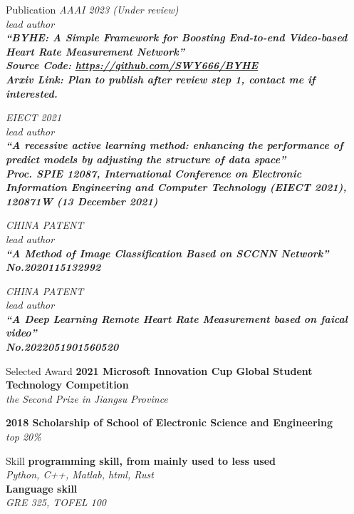 \documentclass{resume} %
\begin{document}
\begin{rSection}{Publication}
    {\em AAAI 2023 (Under review) \\ lead author\\ \bf ``BYHE: A Simple Framework for Boosting End-to-end Video-based Heart Rate Measurement Network'' \\ Source Code: \url{https://github.com/SWY666/BYHE} \\ \em Arxiv Link: Plan to publish after review step 1, contact me if interested.}

    {\em EIECT 2021 \\ lead author \\ \bf ``A recessive active learning method: enhancing the performance of predict models by adjusting the structure of data space'' \\ \em Proc. SPIE 12087, International Conference on Electronic Information Engineering and Computer Technology (EIECT 2021), 120871W (13 December 2021)}

    {\em CHINA PATENT \\ lead author \\ \bf ``A Method of Image Classification Based on SCCNN Network'' \\ \em No.2020115132992}

    {\em CHINA PATENT \\ lead author \\ \bf ``A Deep Learning Remote Heart Rate Measurement based on faical video'' \\ \em No.2022051901560520}

\end{rSection}

\begin{rSection}{Selected Award}
    {{\bf 2021 Microsoft Innovation Cup Global Student Technology Competition} \\ \hfill {\em the Second Prize in Jiangsu Province}}

    {{\bf 2018 Scholarship of School of Electronic Science and Engineering} \\ \hfill {\em top 20\%}}
\end{rSection}

\begin{rSection}{Skill}
    {\bf programming skill, from mainly used to less used} \\
    \hfill {\em Python, C++, Matlab, html, Rust} \\
    {\bf Language skill} \\
    \hfill {\em GRE 325, TOFEL 100}

\end{rSection}
\end{document}
